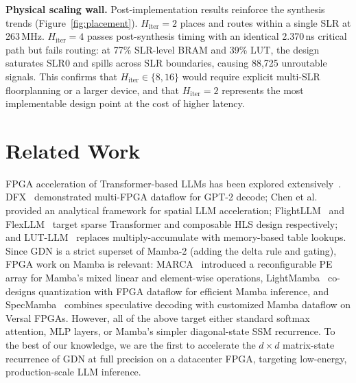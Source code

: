 \documentclass[conference]{IEEEtran}
\begin{document}
\noindent\textbf{Physical scaling wall.}
Post-implementation results reinforce the synthesis trends
(Figure~\ref{fig:placement}). $H_{\mathrm{iter}}{=}2$ places and routes
within a single SLR at 263\,MHz. $H_{\mathrm{iter}}{=}4$ passes
post-synthesis timing with an identical 2.370\,ns critical path but
fails routing: at 77\% SLR-level BRAM and 39\% LUT, the design
saturates SLR0 and spills across SLR boundaries, causing 88{,}725
unroutable signals.  This confirms that
$H_{\mathrm{iter}} \in \{8, 16\}$ would require explicit multi-SLR
floorplanning or a larger device, and that $H_{\mathrm{iter}}{=}2$
represents the most implementable design point at the cost of higher
latency.

\section{Related Work}

FPGA acceleration of Transformer-based LLMs has been explored
extensively~\cite{hong2022dfx,chen2024spatial,zeng2024flightllm,zhang2026flexllm,he2025lutllm,guan2017fpga,han2017ese}.
DFX~\cite{hong2022dfx} demonstrated multi-FPGA dataflow for GPT-2
decode; Chen et al.~\cite{chen2024spatial} provided an analytical
framework for spatial LLM acceleration;
FlightLLM~\cite{zeng2024flightllm} and FlexLLM~\cite{zhang2026flexllm}
target sparse Transformer and composable HLS design respectively; and
LUT-LLM~\cite{he2025lutllm} replaces multiply-accumulate with
memory-based table lookups.
Since GDN is a strict superset of Mamba-2 (adding the delta rule and
gating), FPGA work on Mamba is 
relevant: MARCA~\cite{marca2024} introduced a reconfigurable PE array
for Mamba's mixed linear and element-wise operations,
LightMamba~\cite{lightmamba2025} co-designs quantization with FPGA
dataflow for efficient Mamba inference, and
SpecMamba~\cite{specmamba2025} combines speculative decoding with
customized Mamba dataflow on Versal FPGAs.
However, all of the above target either standard softmax attention,                                                                                    
  MLP layers, or Mamba's simpler diagonal-state SSM recurrence.                                                                                          
  To the best of our knowledge, we are the first to accelerate the                                                                                       
  $d \times d$ matrix-state recurrence of GDN at full precision on a                                                                                     
  datacenter FPGA, targeting low-energy, production-scale LLM inference.
\end{document}
